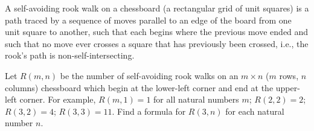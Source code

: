 A self-avoiding rook walk on a chessboard (a rectangular grid of unit squares) is a path traced by a sequence of moves parallel to an edge of the board from one unit square to another, such that each begins where the previous move ended and such that no move ever crosses a square that has previously been crossed, i.e., the rook's path is non-self-intersecting.

Let $ R(m, n)$ be the number of self-avoiding rook walks on an $ m \times n$ ($ m$ rows, $ n$ columns) chessboard which begin at the lower-left corner and end at the upper-left corner. For example, $ R(m, 1) = 1$ for all natural numbers $ m$; $ R(2, 2) = 2$; $ R(3, 2) = 4$; $ R(3, 3) = 11$. Find a formula for $ R(3, n)$ for each natural number $ n$.